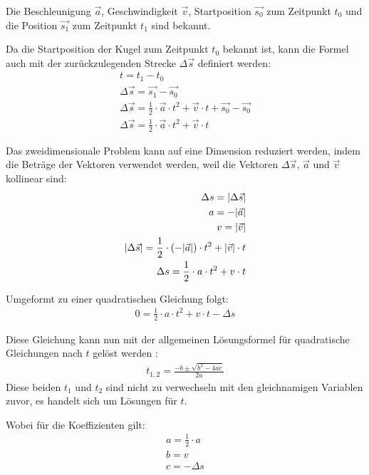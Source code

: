 Die Beschleunigung $\vec{a}$, Geschwindigkeit $\vec{v}$, Startposition $\vec{s_0}$ zum Zeitpunkt $t_0$
und die Position $\vec{s_1}$ zum Zeitpunkt $t_1$ sind bekannt.

Da die Startposition der Kugel zum Zeitpunkt $t_0$ bekannt ist,
kann die Formel auch mit der zurückzulegenden Strecke $\Delta \vec{s}$ definiert werden:
\begin{align}
    t = t_1 - t_0\\
    \Delta \vec{s} = \vec{s_1} - \vec{s_0}\\
    \Delta \vec{s} = \frac{1}{2} \cdot \vec{a} \cdot t^2 + \vec{v} \cdot t + \vec{s_0} - \vec{s_0}\\
    \Delta \vec{s} = \frac{1}{2} \cdot \vec{a} \cdot t^2 + \vec{v} \cdot t
\end{align}

Das zweidimensionale Problem kann auf eine Dimension reduziert werden, indem die Beträge der Vektoren verwendet werden,
weil die Vektoren $\Delta \vec{s}$, $\vec{a}$ und $\vec{v}$ kollinear sind:
\begin{align}
    \Delta s = \lvert \Delta \vec{s} \rvert\\
    a = -\lvert \vec{a} \rvert\\
    v = \lvert \vec{v} \rvert\\
    \lvert \Delta \vec{s} \rvert = \frac{1}{2} \cdot (-\lvert \vec{a} \rvert) \cdot t^2 + \lvert \vec{v} \rvert \cdot t\\
    \Delta s = \frac{1}{2} \cdot a \cdot t^2 + v \cdot t
\end{align}

Umgeformt zu einer quadratischen Gleichung folgt:
\begin{align}
    0 = \frac{1}{2} \cdot a \cdot t^2 + v \cdot t - \Delta s
\end{align}

Diese Gleichung kann nun mit der allgemeinen Lösungsformel für quadratische Gleichungen nach $t$ gelöst werden \cite{wiki.mitternachtsformel:1}:
\begin{align}
    t_{1,2} = \frac{-b \pm \sqrt{b^2 - 4ac}}{2a}
\end{align}
Diese beiden $t_1$ und $t_2$ sind nicht zu verwechseln mit den gleichnamigen Variablen zuvor, es handelt sich um Lösungen für $t$.

Wobei für die Koeffizienten gilt:
\begin{align}
    a = \frac{1}{2} \cdot a\\
    b = v\\
    c = - \Delta s\\
\end{align}

